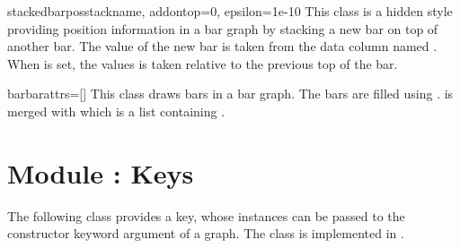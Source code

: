 \begin{classdesc}{stackedbarpos}{stackname, addontop=0, epsilon=1e-10} %
  This class is a hidden style providing position information in a bar
  graph by stacking a new bar on top of another bar. The value of the
  new bar is taken from the data column named . When
   is set, the values is taken relative to the previous
  top of the bar.
\end{classdesc} %

\begin{classdesc}{bar}{barattrs=[]} %
  This class draws bars in a bar graph. The bars are filled using
  .  is merged with 
  which is a list containing .
\end{classdesc} %

\section{Module : Keys} %
\label{graph:key}


The following class provides a key, whose instances can be passed to
the constructor keyword argument  of a graph. The class is
implemented in .

